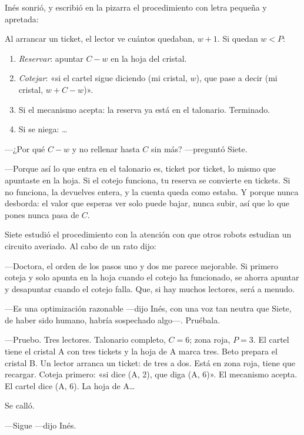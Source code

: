 Inés sonrió, y escribió en la pizarra el procedimiento con letra pequeña y apretada:

\begin{documento}
Al arrancar un ticket, el lector ve cuántos quedaban, $w+1$. Si quedan $w < P$:
\begin{enumerate}
\item \emph{Reservar}: apuntar $C - w$ en la hoja del cristal.
\item \emph{Cotejar}: «si el cartel sigue diciendo (mi cristal, $w$), que pase a decir (mi cristal, $w + C - w$)».
\item Si el mecanismo acepta: la reserva ya está en el talonario. Terminado.
\item Si se niega: \ldots
\end{enumerate}
\end{documento}

---¿Por qué $C - w$ y no rellenar hasta $C$ sin más? ---preguntó Siete.

---Porque así lo que entra en el talonario es, ticket por ticket, lo mismo que apuntaste en la hoja. Si el cotejo funciona, tu reserva se convierte en tickets. Si no funciona, la devuelves entera, y la cuenta queda como estaba. Y porque nunca desborda: el valor que esperas ver solo puede bajar, nunca subir, así que lo que pones nunca pasa de $C$.

\escena
Siete estudió el procedimiento con la atención con que otros robots estudian un circuito averiado. Al cabo de un rato dijo:

---Doctora, el orden de los pasos uno y dos me parece mejorable. Si primero coteja y solo apunta en la hoja cuando el cotejo ha funcionado, se ahorra apuntar y desapuntar cuando el cotejo falla. Que, si hay muchos lectores, será a menudo.

---Es una optimización razonable ---dijo Inés, con una voz tan neutra que Siete, de haber sido humano, habría sospechado algo---\nobreak. Pruébala.

---Pruebo. Tres lectores. Talonario completo, $C=6$; zona roja, $P=3$. El cartel tiene el cristal A con tres tickets y la hoja de A marca tres. Beto prepara el cristal B. Un lector arranca un ticket: de tres a dos. Está en zona roja, tiene que recargar. Coteja primero: «si dice (A, 2), que diga (A, 6)». El mecanismo acepta. El cartel dice (A, 6). La hoja de A\ldots

Se calló.

---Sigue ---dijo Inés.

